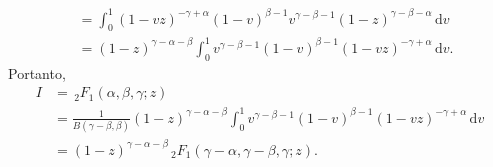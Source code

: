 \documentclass[a4paper,12pt, leqno, answers]{exam}
\begin{document}
\begin{questions}
\begin{parts}
\begin{solution}
\begin{align*}
                &= \int_0^1 (1 - vz)^{-\gamma + \alpha} (1 - v)^{\beta - 1} v^{\gamma - \beta - 1} (1 - z)^{\gamma - \beta - \alpha} \,\mathrm{d}v \\
                &= (1 - z)^{\gamma - \alpha - \beta} \int_0^1 v^{\gamma - \beta - 1} (1 - v)^{\beta - 1} (1 - vz)^{- \gamma + \alpha} \,\mathrm{d}v.
            \end{align*}
            Portanto,
            \begin{align*}
                I &= \,{}_2F_1(\alpha, \beta, \gamma; z) \\
                &= \frac{1}{B(\gamma - \beta, \beta)} (1-z)^{\gamma - \alpha - \beta} \int_0^1 v^{\gamma - \beta - 1} (1 - v)^{\beta - 1} (1 - vz)^{-\gamma + \alpha} \,\mathrm{d}v \\
                &= (1 - z)^{\gamma - \alpha - \beta} \,_2F_1(\gamma - \alpha, \gamma - \beta, \gamma; z).
            \end{align*}
        \end{solution}


\end{parts}
\end{questions}
\end{document}
